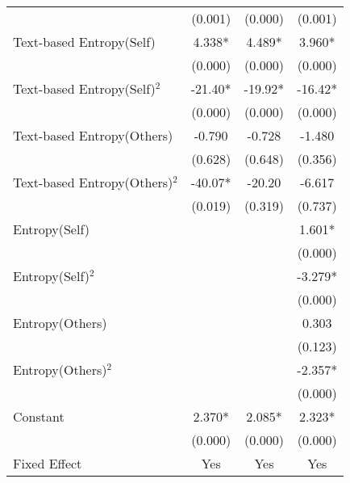 \begin{table}[]
\begin{tabular}{@{}lccc@{}}
                                                         & (0.001)    & (0.000)    & (0.001)    \\
Text-based Entropy(Self)                                 & 4.338*     & 4.489*     & 3.960*     \\
                                                         & (0.000)    & (0.000)    & (0.000)    \\
Text-based Entropy(Self)$^2$    & -21.40*    & -19.92*    & -16.42*    \\
                                                         & (0.000)    & (0.000)    & (0.000)    \\
Text-based Entropy(Others)                               & -0.790     & -0.728     & -1.480     \\
                                                         & (0.628)    & (0.648)    & (0.356)    \\
Text-based Entropy(Others)$^2$   & -40.07*    & -20.20     & -6.617     \\
                                                         & (0.019)    & (0.319)    & (0.737)    \\
Entropy(Self)                                            &            &            & 1.601*     \\
                                                         &            &            & (0.000)    \\
Entropy(Self)$^2$                                        &            &            & -3.279*    \\
                                                         &            &            & (0.000)    \\
Entropy(Others)                                          &            &            & 0.303      \\
                                                         &            &            & (0.123)    \\
Entropy(Others)$^2$                                      &            &            & -2.357*    \\
                                                         &            &            & (0.000)    \\
Constant                                                 & 2.370*     & 2.085*     & 2.323*     \\
                                                         & (0.000)    & (0.000)    & (0.000)    \\
Fixed Effect                                             & Yes        & Yes        & Yes        \\

\end{tabular}
\end{table}
